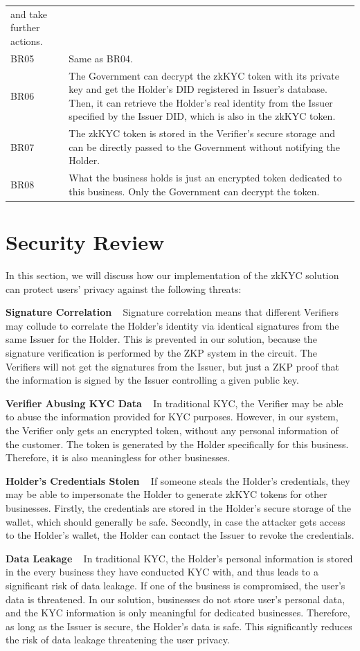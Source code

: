 \documentclass[
]{report}
\begin{document}
\begin{longtable}[]{@{}
  >{\raggedright\arraybackslash}p{}
  >{\raggedright\arraybackslash}p{}@{}}
and take further actions. \\
BR05 & Same as BR04. \\
BR06 & The Government can decrypt the zkKYC token with its private key
and get the Holder's DID registered in Issuer's database. Then, it can
retrieve the Holder's real identity from the Issuer specified by the
Issuer DID, which is also in the zkKYC token. \\
BR07 & The zkKYC token is stored in the Verifier's secure storage and
can be directly passed to the Government without notifying the
Holder. \\
BR08 & What the business holds is just an encrypted token dedicated to
this business. Only the Government can decrypt the token. \\
\end{longtable}
\section{Security Review}
In this section, we will discuss how our implementation of the zkKYC
solution can protect users' privacy against the following threats:

\textbf{Signature Correlation} ~ Signature correlation means that
different Verifiers may collude to correlate the Holder's identity
via identical signatures from the same Issuer for the Holder. This
is prevented in our solution, because the signature verification is
performed by the ZKP system in the circuit. The Verifiers will not
get the signatures from the Issuer, but just a ZKP proof that the
information is signed by the Issuer controlling a given public key.

\textbf{Verifier Abusing KYC Data} ~ In traditional KYC, the Verifier
may be able to abuse the information provided for KYC purposes. However,
in our system, the Verifier only gets an encrypted token, without any
personal information of the customer. The token is generated by the
Holder specifically for this business. Therefore, it is also meaningless
for other businesses.

\textbf{Holder's Credentials Stolen} ~ If someone steals the Holder's
credentials, they may be able to impersonate the Holder to generate
zkKYC tokens for other businesses. Firstly, the credentials are stored
in the Holder's secure storage of the wallet, which should generally be
safe. Secondly, in case the attacker gets access to the Holder's
wallet, the Holder can contact the Issuer to revoke the credentials.

\textbf{Data Leakage} ~ In traditional KYC, the Holder's personal
information is stored in the every business they have conducted KYC
with, and thus leads to a significant risk of data leakage. If one of
the business is compromised, the user's data is threatened. In our
solution, businesses do not store user's personal data, and the KYC
information is only meaningful for dedicated businesses.
Therefore, as long as the Issuer is secure, the Holder's data is safe.
This significantly reduces the risk of data leakage threatening the
user privacy.
\end{document}
